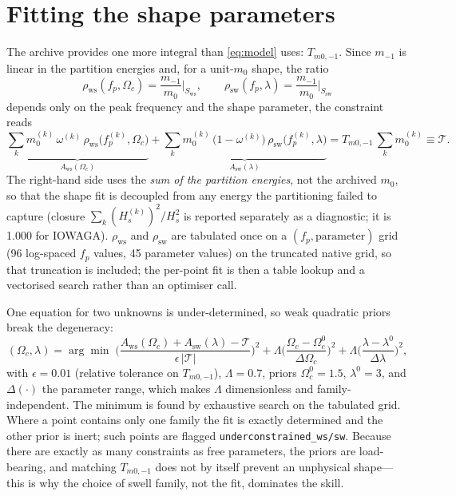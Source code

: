 \documentclass[11pt,a4paper]{article}
\newcommand{\Hs}{H_s}
\begin{document}
\section{Fitting the shape parameters}
\label{sec:fit}

The archive provides one more integral than \eqref{eq:model} uses: $T_{m0,-1}$. Since $m_{-1}$ is
linear in the partition energies and, for a unit-$m_0$ shape, the ratio
\begin{equation}
\rho_{\mathrm{ws}}(f_p,\Omega_c) = \frac{m_{-1}}{m_0}\Big|_{S_{\mathrm{ws}}},\qquad
\rho_{\mathrm{sw}}(f_p,\lambda) = \frac{m_{-1}}{m_0}\Big|_{S_{\mathrm{sw}}}
\end{equation}
depends only on the peak frequency and the shape parameter, the constraint reads
\begin{equation}
\underbrace{\sum_k m_0^{(k)}\,\omega^{(k)}\,\rho_{\mathrm{ws}}\big(f_p^{(k)},\Omega_c\big)}_{A_{\mathrm{ws}}(\Omega_c)}
+\underbrace{\sum_k m_0^{(k)}\,\big(1-\omega^{(k)}\big)\,\rho_{\mathrm{sw}}\big(f_p^{(k)},\lambda\big)}_{A_{\mathrm{sw}}(\lambda)}
= T_{m0,-1}\,\sum_k m_0^{(k)} \equiv \mathcal{T} .
\end{equation}
The right-hand side uses the \emph{sum of the partition energies}, not the archived $m_0$, so that
the shape fit is decoupled from any energy the partitioning failed to capture (closure
$\sum_k (\Hs^{(k)})^2/\Hs^2$ is reported separately as a diagnostic; it is 1.000 for IOWAGA).
$\rho_{\mathrm{ws}}$ and $\rho_{\mathrm{sw}}$ are tabulated once on a $(f_p,\text{parameter})$ grid
(96 log-spaced $f_p$ values, 45 parameter values) on the truncated native grid, so that truncation is
included; the per-point fit is then a table lookup and a vectorised search rather than an optimiser call.

One equation for two unknowns is under-determined, so weak quadratic priors break the degeneracy:
\begin{equation}
(\Omega_c,\lambda) = \arg\min\;
\Big(\frac{A_{\mathrm{ws}}(\Omega_c)+A_{\mathrm{sw}}(\lambda)-\mathcal{T}}{\epsilon\,|\mathcal{T}|}\Big)^2
+ \Lambda\Big(\frac{\Omega_c-\Omega_c^0}{\Delta\Omega_c}\Big)^2
+ \Lambda\Big(\frac{\lambda-\lambda^0}{\Delta\lambda}\Big)^2,
\end{equation}
with $\epsilon = 0.01$ (relative tolerance on $T_{m0,-1}$), $\Lambda=0.7$, priors
$\Omega_c^0 = 1.5$, $\lambda^0 = 3$, and $\Delta(\cdot)$ the parameter range, which makes $\Lambda$
dimensionless and family-independent. The minimum is found by exhaustive search on the tabulated
grid. Where a point contains only one family the fit is exactly determined and the other prior is
inert; such points are flagged \texttt{underconstrained\_ws/sw}. Because there are exactly as many
constraints as free parameters, the priors are load-bearing, and matching $T_{m0,-1}$ does not by
itself prevent an unphysical shape---this is why the choice of swell family, not the fit, dominates
the skill.
\end{document}
